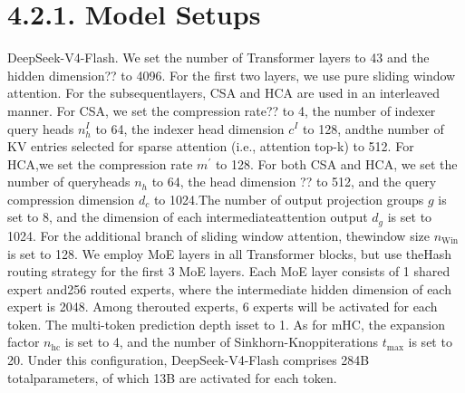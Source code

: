 \documentclass[
  10
]{article}
\begin{document}
\section{4.2.1. Model Setups}\label{model-setups}

DeepSeek-V4-Flash. We set the number of Transformer layers to 43 and the
hidden dimension?? to 4096. For the first two layers, we use pure
sliding window attention. For the subsequentlayers, CSA and HCA are used
in an interleaved manner. For CSA, we set the compression rate?? to 4,
the number of indexer query heads \(n _ { h } ^ { I }\) to 64, the
indexer head dimension \(c ^ { I }\) to 128, andthe number of KV entries
selected for sparse attention (i.e., attention top-k) to 512. For HCA,we
set the compression rate \(m ^ { \prime }\) to 128. For both CSA and
HCA, we set the number of queryheads \(n _ { h }\) to 64, the head
dimension ?? to 512, and the query compression dimension \(d _ { c }\)
to 1024.The number of output projection groups \(g\) is set to 8, and
the dimension of each intermediateattention output \(d _ { g }\) is set
to 1024. For the additional branch of sliding window attention,
thewindow size \(n _ { \mathrm { W i n } }\) is set to 128. We employ
MoE layers in all Transformer blocks, but use theHash routing strategy
for the first 3 MoE layers. Each MoE layer consists of 1 shared expert
and256 routed experts, where the intermediate hidden dimension of each
expert is 2048. Among therouted experts, 6 experts will be activated for
each token. The multi-token prediction depth isset to 1. As for mHC, the
expansion factor \(n _ { \mathrm { h c } }\) is set to 4, and the number
of Sinkhorn-Knoppiterations \(t _ { \mathrm { m a x } }\) is set to 20.
Under this configuration, DeepSeek-V4-Flash comprises 284B
totalparameters, of which 13B are activated for each token.
\end{document}
